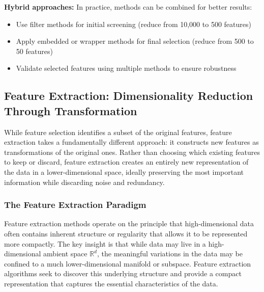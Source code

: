 \textbf{Hybrid approaches:} In practice, methods can be combined for better results:
\begin{itemize}
\item Use filter methods for initial screening (reduce from 10,000 to 500 features)
\item Apply embedded or wrapper methods for final selection (reduce from 500 to 50 features)
\item Validate selected features using multiple methods to ensure robustness
\end{itemize}





\subsection*{Feature Extraction: Dimensionality Reduction Through Transformation}

While feature selection identifies a subset of the original features, \alert{feature extraction} takes a fundamentally different approach: it constructs new features as transformations of the original ones. Rather than choosing which existing features to keep or discard, feature extraction creates an entirely new representation of the data in a lower-dimensional space, ideally preserving the most important information while discarding noise and redundancy.

\subsubsection*{The Feature Extraction Paradigm}

Feature extraction methods operate on the principle that high-dimensional data often contains inherent structure or regularity that allows it to be represented more compactly. The key insight is that while data may live in a high-dimensional ambient space $\mathbb{R}^d$, the meaningful variations in the data may be confined to a much lower-dimensional manifold or subspace. Feature extraction algorithms seek to discover this underlying structure and provide a compact representation that captures the essential characteristics of the data.

